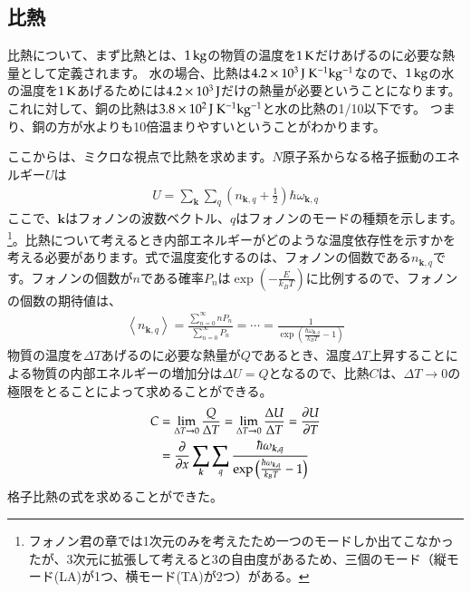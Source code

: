 \documentclass[10pt,b5paper,papersize,dvipdfmx]{jsbook}
\begin{document}
\subsection{比熱}
比熱について、まず比熱とは、$1 \tani{kg}$の物質の温度を$1 \tani{K}$だけあげるのに必要な熱量として定義されます。
水の場合、比熱は$4.2 \times 10^3 \tani{J\ K ^{-1} kg^{-1}}$なので、$1 \tani{kg}$の水の温度を$1 \tani{K}$あげるためには$4.2 \times 10^3 \tani{J}$だけの熱量が必要ということになります。
これに対して、銅の比熱は$3.8 \times 10^2\tani{J\ K ^{-1} kg^{-1}}$と水の比熱の1/10以下です。
つまり、銅の方が水よりも10倍温まりやすいということがわかります。\par
ここからは、ミクロな視点で比熱を求めます。$N$原子系からなる格子振動のエネルギー$U$は
\begin{align}
  U = \sum_{\bm{k}}\sum_{q}\left(n_{\bm{k},q} + \frac{1}{2}\right)\hbar \omega_{\bm{k},q}
  \label{eq:nemui}
\end{align}
ここで、$\bm{k}$はフォノンの波数ベクトル、$q$はフォノンのモードの種類を示します。\footnote{フォノン君の章では1次元のみを考えたため一つのモードしか出てこなかったが、3次元に拡張して考えると3の自由度があるため、三個のモード（縦モード(LA)が1つ、横モード(TA)が2つ）がある。}。比熱について考えるとき内部エネルギーがどのような温度依存性を示すかを考える必要があります。式で温度変化するのは、フォノンの個数である$n_{\bm{k},q}$です。フォノンの個数が$n$である確率$P_n$は$\exp\left(-\frac{E}{k_BT}\right)$に比例するので、フォノンの個数の期待値は、
\begin{align}
  \left\langle n_{\bm{k},q}\right\rangle = \frac{\sum_{n = 0}^\infty nP_n}{\sum_{n = 0}^\infty P_n} = \cdots = \frac{1}{\exp \left(\frac{\hbar \omega_{\bm{k}, q}}{k_BT}-1\right)}
\end{align}
物質の温度を$\Delta T$あげるのに必要な熱量が$Q$であるとき、温度$\Delta T$上昇することによる物質の内部エネルギーの増加分は$\Delta U = Q$となるので、比熱$C$は、$\Delta T \rightarrow 0$の極限をとることによって求めることができる。
\begin{align}
  C &= \lim_{\Delta T \rightarrow 0} \frac{Q}{\Delta T} = \lim_{\Delta T \rightarrow 0} \frac{\Delta U}{\Delta T} = \pdv{U}{T}\\
    &= \pdv{x} \sum_{\bm{k}}\sum_{q}\frac{\hbar \omega_{\bm{k},q}}{\exp\left(\frac{\hbar \omega_{\bm{k},q}}{k_BT}-1\right)}
\label{eq:totemonemutai}
\end{align}
格子比熱の式を求めることができた。
\end{document}
